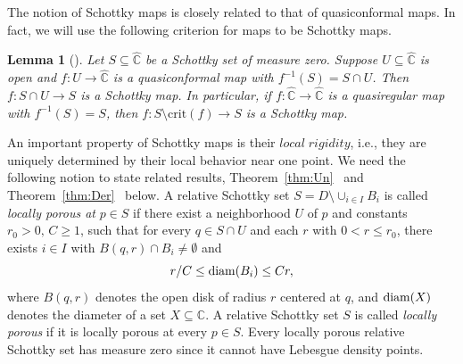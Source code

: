 \documentclass[12pt]{amsart}
\newtheorem{lem}[thm]{Lemma}
\newcommand{\C}{\mathbb{C}}
\newcommand{\ra}{\rightarrow}
\newcommand{\hC}{\widehat{\C}}
\newcommand{\sub}{\subseteq }
\newcommand{\co}{\colon}
\begin{document}
The notion of Schottky maps is closely related to that of quasiconformal maps. In fact, we will use the following criterion \cite[Lemma~2.2]{Me3} for maps to be Schottky maps. 
\begin{lem}[\cite{Me3}]\label{lem:Schmaps} 
  Let $S\sub \hC$ be a Schottky set of measure zero. 
Suppose   $U\sub \hC$ is  open and   $f\co  U\ra \hC$ is  a quasiconformal map with $f^{-1}(S)=S\cap U$.
Then $f\co S\cap U\to S$ is a Schottky map. 
In particular, if $f\co \hC\ra \hC$ is a quasiregular map with $f^{-1}(S)=S$, then 
$f\co S\setminus \mathrm{crit}(f)\to S$ is a Schottky map. 
\end{lem}


An important property of Schottky maps is their $local\;rigidity$, i.e., they are uniquely determined by their local behavior near one point. We need the following notion to state related results, Theorem~\ref{thm:Un}~\cite[Corollary~4.2]{Me2} and Theorem~\ref{thm:Der}~\cite[Theorem~5.2]{Me2} below. A relative Schottky set $S=D\setminus\cup_{i\in I} B_i$ is called \emph{locally porous at} $p\in S$ if there exist a neighborhood $U$ of $p$ and constants $r_0>0,\, C\geq 1$, such that for every $q\in S\cap U$ and each $r$ with $0<r\leq r_0$, there exists $i\in I$ with $B(q,r)\cap B_i\neq \emptyset$ and
$$
r/C\leq {\rm diam}(B_i)\leq Cr,
$$
where $B(q,r)$ denotes the open disk of radius $r$ centered at $q$, and ${\rm diam}(X)$ denotes the diameter of a set $X\subseteq\C$. A relative Schottky set $S$ is called \emph{locally porous} if it is locally porous at every $p\in S$. Every locally porous relative Schottky set has measure zero since it cannot have Lebesgue density points.
\end{document}

